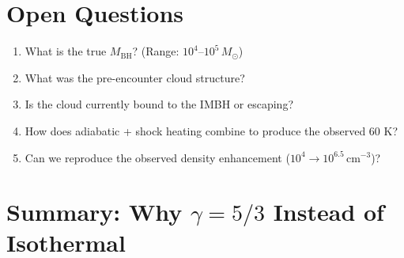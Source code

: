 \documentclass[11pt,a4paper]{article}
\newcommand{\Msun}{M_\odot}
\newcommand{\cmcubed}{\,\mathrm{cm^{-3}}}
\begin{document}
\section{Open Questions}

\begin{enumerate}
    \item What is the true $M_\mathrm{BH}$? (Range: $10^4$--$10^5\,\Msun$)
    \item What was the pre-encounter cloud structure?
    \item Is the cloud currently bound to the IMBH or escaping?
    \item How does adiabatic + shock heating combine to produce the observed 60 K?
    \item Can we reproduce the observed density enhancement ($10^4 \to 10^{6.5}\cmcubed$)?
\end{enumerate}

\section{Summary: Why $\gamma = 5/3$ Instead of Isothermal}
\end{document}
